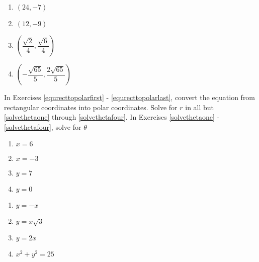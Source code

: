 \documentclass{ximera}
\begin{document}
\begin{multicols}{4} 

\begin{enumerate}

\setcounter{enumi}{\value{HW}}

\item  $\left(24, -7 \right)$ 
\item $\left(12, -9\right)$ 
\item $\left(\dfrac{\sqrt{2}}{4}, \dfrac{\sqrt{6}}{4}\right)$
\item  $\left(-\dfrac{\sqrt{65}}{5}, \dfrac{2\sqrt{65}}{5}\right)$ \label{recttopolarlast}

\setcounter{HW}{\value{enumi}}

\end{enumerate}

\end{multicols}

In Exercises \ref{equrecttopolarfirst} - \ref{equrecttopolarlast}, convert the equation from rectangular coordinates into polar coordinates.  Solve for $r$ in all but \ref{solvethetaone} through \ref{solvethetafour}.  In Exercises \ref{solvethetaone} - \ref{solvethetafour},  solve for $\theta$

\begin{multicols}{4}

\begin{enumerate}

\setcounter{enumi}{\value{HW}}

\item $x = 6$ \label{equrecttopolarfirst}
\item $x = -3$
\item $y = 7$
\item $y = 0$ \label{solvethetaone} 

\setcounter{HW}{\value{enumi}}

\end{enumerate}

\end{multicols}

\begin{multicols}{4} 

\begin{enumerate}

\setcounter{enumi}{\value{HW}}

\item $y = -x$  
\item $y = x\sqrt{3}$  
\item $y = 2x$ \label{solvethetafour} 
\item $x^2 + y^2 = 25$

\setcounter{HW}{\value{enumi}}

\end{enumerate}

\end{multicols}
\end{document}

